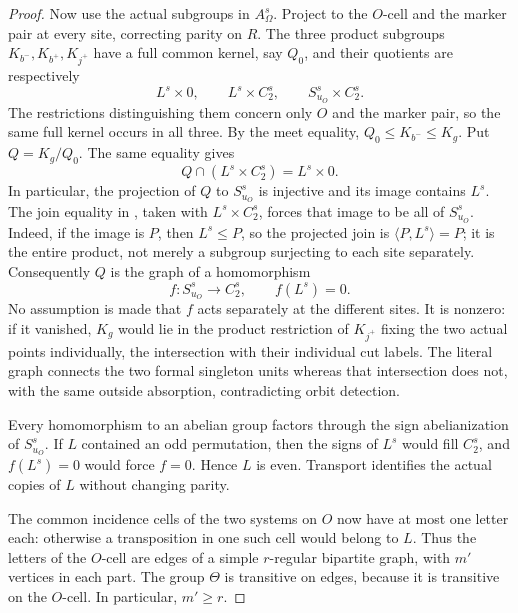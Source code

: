 \begin{proof}
Now use the actual subgroups in \(A_\Omega^s\).  Project to the \(O\)-cell
and the marker pair at every site, correcting parity on \(R\).  The three
product subgroups \(K_{b^-},K_{b^+},K_{j^+}\) have a full common kernel,
say \(Q_0\), and their quotients are respectively
\[
 L^s\times0,\qquad L^s\times C_2^s,
 \qquad S_{u_O}^s\times C_2^s.
\]
The restrictions distinguishing them concern only \(O\) and the marker
pair, so the same full kernel occurs in all three.  By the meet equality,
\(Q_0\le K_{b^-}\le K_g\).  Put \(Q=K_g/Q_0\).  The same equality gives
\[
 Q\cap(L^s\times C_2^s)=L^s\times0.
\]
In particular, the projection of \(Q\) to \(S_{u_O}^s\) is injective and its
image contains \(L^s\).  The join equality in
, taken with
\(L^s\times C_2^s\), forces that image to be all of \(S_{u_O}^s\).
Indeed, if the image is \(P\), then \(L^s\le P\), so the projected
join is \(\langle P,L^s\rangle=P\); it is the entire product,
not merely a subgroup surjecting to each site separately.
Consequently \(Q\) is the graph of a homomorphism
\[
 f:S_{u_O}^s\longrightarrow C_2^s,
 \qquad f(L^s)=0.
\]
No assumption is made that \(f\) acts separately at the different sites.
It is nonzero: if it vanished, \(K_g\) would lie in the product restriction
of \(K_{j^+}\) fixing the two actual points individually, the intersection
with their individual cut labels.  The literal graph connects the two
formal singleton units whereas that intersection does not, with the same
outside absorption, contradicting orbit detection.

Every homomorphism to an abelian group factors through the sign
abelianization of \(S_{u_O}^s\).  If \(L\) contained an odd permutation,
then the signs of \(L^s\) would fill \(C_2^s\), and \(f(L^s)=0\) would force
\(f=0\).  Hence \(L\) is even.  Transport identifies the actual copies of
\(L\) without changing parity.

The common incidence cells of the two systems on \(O\) now have at most one
letter each: otherwise a transposition in one such cell would belong to
\(L\).  Thus the letters of the \(O\)-cell are edges of a simple
\(r\)-regular bipartite graph, with \(m'\) vertices in each part.  The group
\(\Theta\) is transitive on edges, because it is transitive on the
\(O\)-cell.  In particular, \(m'\ge r\).


\end{proof}
